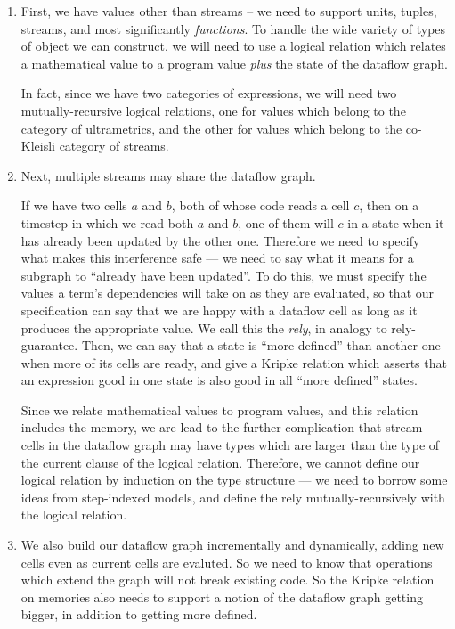 \documentclass[preprint]{sigplanconf}
\begin{document}
\begin{enumerate}

\item First, we have values other than streams -- we need to support
  units, tuples, streams, and most significantly \emph{functions}.
  To handle the wide variety of types of object we can construct, we
  will need to use a logical relation which relates a mathematical
  value to a program value \emph{plus} the state of the dataflow 
  graph. 

  In fact, since we have two categories of expressions, we will need
  two mutually-recursive logical relations, one for values which
  belong to the category of ultrametrics, and the other for values
  which belong to the co-Kleisli category of streams.

\item Next, multiple streams may share the dataflow graph.

  If we have two cells $a$ and $b$, both of whose code reads a cell
  $c$, then on a timestep in which we read both $a$ and $b$, one of
  them will $c$ in a state when it has already been updated by the
  other one. Therefore we need to specify what makes this interference
  safe --- we need to say what it means for a subgraph to ``already
  have been updated''. To do this, we must specify the values a term's
  dependencies will take on as they are evaluated, so that our
  specification can say that we are happy with a dataflow cell as long
  as it produces the appropriate value. We call this the \emph{rely},
  in analogy to rely-guarantee. Then, we can say that a state is
  ``more defined'' than another one when more of its cells are ready,
  and give a Kripke relation which asserts that an expression good in
  one state is also good in all ``more defined'' states.

  Since we relate mathematical values to program values, and this
  relation includes the memory, we are lead to the further
  complication that stream cells in the dataflow graph may have types
  which are larger than the type of the current clause of the logical
  relation. Therefore, we cannot define our logical relation by
  induction on the type structure --- we need to borrow some ideas
  from step-indexed models, and define the rely mutually-recursively
  with the logical relation.

\item We also build our dataflow graph incrementally and dynamically,
  adding new cells even as current cells are evaluted. So we need to
  know that operations which extend the graph will not break existing
  code. So the Kripke relation on memories also needs to support a
  notion of the dataflow graph getting bigger, in addition to getting
  more defined.


\end{enumerate}
\end{document}
